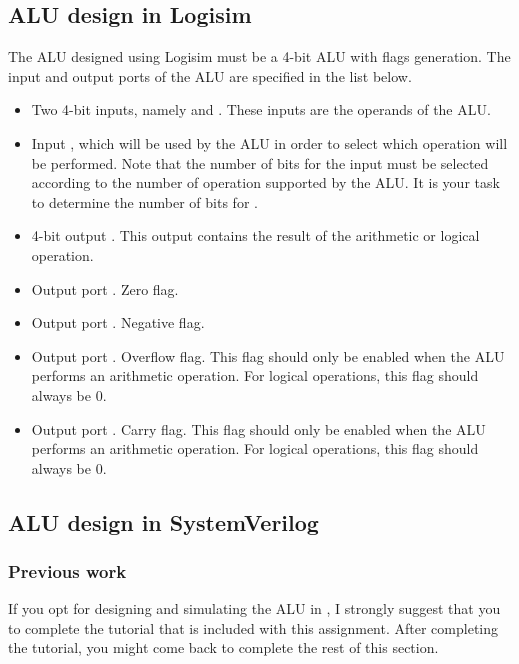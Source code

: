 \documentclass[number=03]{assignment}
\begin{document}
\subsection{ALU design in Logisim}\label{Sec:ALU_Logisim}
The \ac{ALU} designed using Logisim must be a 4-bit \ac{ALU} with flags generation.
The input and output ports of the \ac{ALU} are specified in the list below.
\begin{itemize}
\item Two 4-bit inputs, namely  and . 
These inputs are the operands of the \ac{ALU}.
\item Input , which will be used by the \ac{ALU} in order to select which operation will be performed.
Note that the number of bits for the input  must be selected according to the number of operation supported by the \ac{ALU}. 
It is your task to determine the number of bits for .
\item 4-bit output .
This output contains the result of the arithmetic or logical operation.
\item Output port . Zero flag.
\item Output port . Negative flag.
\item Output port . Overflow flag. 
This flag should only be enabled when the \ac{ALU} performs an arithmetic operation. 
For logical operations, this flag should always be 0.
\item Output port . Carry flag.
This flag should only be enabled when the \ac{ALU} performs an arithmetic operation. 
For logical operations, this flag should always be 0.
 
\end{itemize}



\subsection{ALU design in SystemVerilog}\label{Sec:ALU_SV}

\subsubsection{Previous work}
If you opt for designing and simulating the \ac{ALU} in \SV, I strongly suggest that you to complete the \SV tutorial that is included with this assignment.
After completing the tutorial, you might come back to complete the rest of this section.
\end{document}
